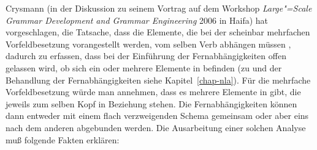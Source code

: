 Crysmann (in der Diskussion zu seinem Vortrag auf dem Workshop \emph{Large"=Scale Grammar Development and Grammar Engineering} 
2006 in Haifa) hat vorgeschlagen, die Tatsache, dass die Elemente, die bei der scheinbar mehrfachen Vorfeldbesetzung
vorangestellt werden, vom selben Verb abhängen müssen \citep[]{Fanselow93a}, dadurch zu erfassen, dass bei der Einführung
der Fernabhängigkeiten offen gelassen wird, ob sich ein oder mehrere Elemente in \slasch befinden
(zu \slasch und der Behandlung der Fernabhängigkeiten siehe Kapitel~\ref{chap-nla}).
Für die mehrfache Vorfeldbesetzung würde man annehmen, dass es mehrere Elemente in \slasch gibt,
die jeweils zum selben Kopf in Beziehung stehen. Die Fernabhängigkeiten können dann entweder mit einem
flach verzweigenden Schema gemeinsam oder aber eins nach dem anderen abgebunden werden.
Die Ausarbeitung einer solchen Analyse muß folgende Fakten erklären:
